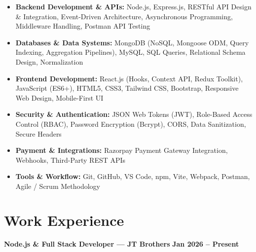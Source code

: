 \documentclass[a4paper,10pt]{article}
\begin{document}
\begin{itemize}

    \item \textbf{Backend Development \& APIs:}
    Node.js, Express.js, RESTful API Design \& Integration, Event-Driven Architecture,
    Asynchronous Programming, Middleware Handling, Postman API Testing

    \item \textbf{Databases \& Data Systems:}
    MongoDB (NoSQL, Mongoose ODM, Query Indexing, Aggregation Pipelines),
    MySQL, SQL Queries, Relational Schema Design, Normalization

    \item \textbf{Frontend Development:}
    React.js (Hooks, Context API, Redux Toolkit), JavaScript (ES6+),
    HTML5, CSS3, Tailwind CSS, Bootstrap, Responsive Web Design, Mobile-First UI

    \item \textbf{Security \& Authentication:}
    JSON Web Tokens (JWT), Role-Based Access Control (RBAC),
    Password Encryption (Bcrypt), CORS, Data Sanitization, Secure Headers

    \item \textbf{Payment \& Integrations:}
    Razorpay Payment Gateway Integration, Webhooks, Third-Party REST APIs

    \item \textbf{Tools \& Workflow:}
    Git, GitHub, VS Code, npm, Vite, Webpack, Postman, Agile / Scrum Methodology

\end{itemize}

\section*{Work Experience}

\textbf{Node.js \& Full Stack Developer --- JT Brothers}
\hfill
\textbf{Jan 2026 -- Present}
\end{document}
